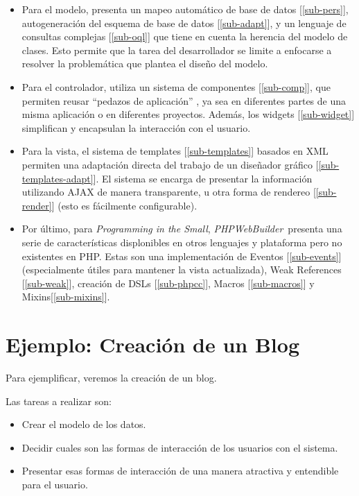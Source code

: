 \documentclass[a4paper,10pt]{article}
\newcommand{\PITS}{\emph{Programming in the Small}} %
\newcommand{\PWB}{\emph{PHPWebBuilder}}
\begin{document}
\begin{itemize}
\item Para el modelo, presenta un mapeo automático de base de datos [\ref{sub-pers}], autogeneración del esquema de base de datos [\ref{sub-adapt}], y un lenguaje de consultas complejas [\ref{sub-oql}] que tiene en cuenta la herencia del modelo de clases.  Esto permite que la tarea del desarrollador se limite a enfocarse a resolver la problemática que plantea el diseño del modelo.

\item Para el controlador, utiliza un sistema de componentes [\ref{sub-comp}], que permiten reusar ``pedazos de aplicación'' , ya sea en diferentes partes de una misma aplicación o en diferentes proyectos. Además, los widgets [\ref{sub-widget}] simplifican y encapsulan la interacción con el usuario.

\item Para la vista, el sistema de templates [\ref{sub-templates}] basados en XML permiten una adaptación directa del trabajo de un diseñador gráfico [\ref{sub-templates-adapt}]. El sistema se encarga de presentar la información utilizando AJAX de manera transparente, u otra forma de rendereo [\ref{sub-render}] (esto es fácilmente configurable).

\item Por último, para \PITS, \PWB \ presenta una serie de características displonibles en otros lenguajes y plataforma pero no existentes en PHP. Estas son una implementación de Eventos [\ref{sub-events}] (especialmente útiles para mantener la vista actualizada), Weak References [\ref{sub-weak}], creación de DSLs [\ref{sub-phpcc}], Macros [\ref{sub-macros}] y Mixins[\ref{sub-mixins}].

\end{itemize}

\section{Ejemplo: Creación de un Blog}
Para ejemplificar, veremos la creación de un blog.

Las tareas a realizar son:
\begin{itemize}
\item Crear el modelo de los datos.
\item Decidir cuales son las formas de interacción de los usuarios con el sistema.
\item Presentar esas formas de interacción de una manera atractiva y entendible para el usuario.
\end{itemize}

\end{document}
